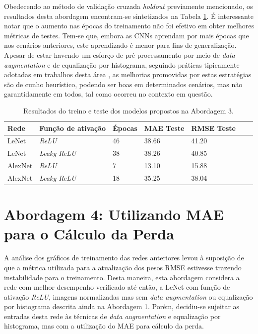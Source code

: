 	Obedecendo ao método de validação cruzada \emph{holdout} previamente mencionado, os resultados desta abordagem encontram-se sintetizados na Tabela \ref{tab:results-3}. É interessante notar que o aumento nas épocas do treinamento não foi efetivo em obter melhores métricas de testes. Tem-se que, embora as CNNs aprendam por mais épocas que nos cenários anteriores, este aprendizado é menor para fins de generalização. Apesar de estar havendo um esforço de pré-processamento por meio de \emph{data augmentation} e de equalização por histograma, seguindo práticas tipicamente adotadas em trabalhos desta área \cite{chollet2017deep}, as melhorias promovidas por estas estratégias são de cunho heurístico, podendo ser boas em determinados cenários, mas não garantidamente em todos, tal como ocorreu no contexto em questão.

	\begin{table}[!ht]
		\caption{Resultados do treino e teste dos modelos propostos na Abordagem 3.}
		\label{tab:results-3}
		\centering
		\begin{tabular}{l l l l l l l}
				\toprule
				Rede & Função de ativação & Épocas & MAE Teste & RMSE Teste \\
				\midrule
				LeNet & \emph{ReLU} & 46 &  38.66 & 41.20 \\
				LeNet & \emph{Leaky ReLU} &  38 & 38.26 & 40.85 \\
				AlexNet & \emph{ReLU} & 7 & 13.10 & 15.88 \\
				AlexNet & \emph{Leaky ReLU} & 18 & 35.25 & 38.04 \\
				\bottomrule
			\end{tabular}
	\end{table}

\section{Abordagem 4: Utilizando MAE para o Cálculo da Perda}%
	A análise dos gráficos de treinamento das redes anteriores levou à suposição de que a métrica utilizada para a atualização dos pesos RMSE estivesse trazendo instabilidade para o treinamento. Desta maneira, esta abordagem considera a rede com melhor desempenho verificado até então, a LeNet com função de ativação \emph{ReLU}, imagens normalizadas mas sem \emph{data augmentation} ou equalização por histograma descrita ainda na Abordagem 1. Porém, decidiu-se sujeitar as entradas desta rede às técnicas de \emph{data augmentation} e equalização por histograma, mas com a utilização do MAE para cálculo da perda.

